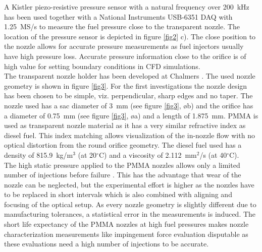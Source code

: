 \documentclass[letterpaper,twocolumn,10pt]{ilass}
\begin{document}
A Kistler piezo-resistive pressure sensor with a natural frequency over 200~kHz has been used
together with a National Instruments USB-6351 DAQ with 1.25~MS/s to measure the fuel pressure
close to the transparent nozzle. The location of the pressure sensor is depicted in figure
\ref{fig2} c). The close position to the nozzle allows for accurate pressure measurements as
fuel injectors usually have high pressure loss. Accurate pressure information close to the
orifice is of high value for setting boundary conditions in CFD simulations. \\
%
The transparent nozzle holder has been developed at Chalmers \cite{Falgout2016}. The used nozzle
geometry is shown in figure \ref{fig3}. For the first investigations the nozzle design has been
chosen to be simple, viz. perpendicular, sharp edges and no taper. The nozzle used has a sac
diameter of 3~mm (see figure \ref{fig3},  {\o b}) and the orifice has a diameter of 0.75~mm
(see figure \ref{fig3},  {\o a}) and a length of 1.875~mm.
PMMA is used as transparent nozzle material as it has a very similar refractive index as
diesel fuel. This index matching allows visualization of the in-nozzle flow with no optical
distortion from the round orifice geometry. The diesel fuel used has a density of
815.9~kg/m$^3$ (at 20$^{\circ}$C) and a viscosity of 2.112~mm$^2$/s (at 40$^{\circ}$C).\\
%
The high static pressure applied to the PMMA nozzles allows only a limited number of injections
before failure \cite{Falgout2016}. This has the advantage that wear of the nozzle can be
neglected, but the experimental effort is higher as the nozzles have to be replaced in short
intervals which is also combined with aligning and focusing of the optical setup. As every
nozzle geometry is slightly different due to manufacturing tolerances, a statistical error
in the measurements is induced. The short life expectancy of the PMMA nozzles at high fuel
pressures makes nozzle characterization measurements like impingement force evaluation
disputable as these evaluations need a high number of injections to be accurate.\\
%


\end{document}

